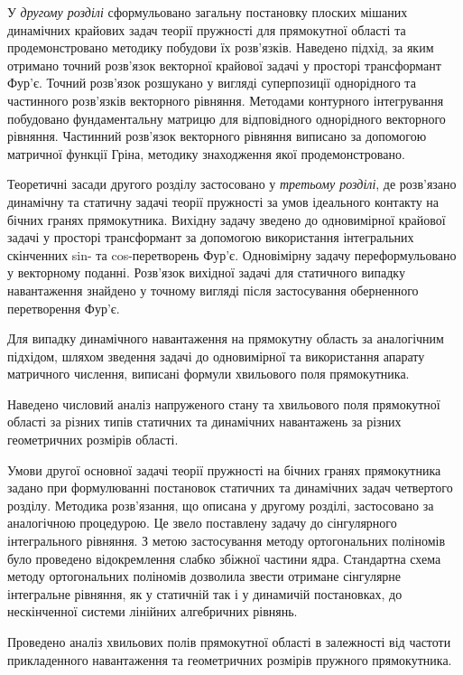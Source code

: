 У \textit{другому розділі} сформульовано загальну постановку плоских мішаних динамічних крайових задач теорії пружності для прямокутної області та
продемонстровано методику побудови їх розв'язків.
Наведено підхід, за яким отримано точний розв'язок векторної крайової задачі у просторі трансформант Фур'є.
Точний розв'язок розшукано у вигляді суперпозиції однорідного та частинного розв'язків векторного рівняння.
Методами контурного інтегрування побудовано фундаментальну матрицю для відповідного однорідного векторного рівняння.
Частинний розв'язок векторного рівняння виписано за допомогою матричної функції Гріна, методику знаходження якої продемонстровано.

Теоретичні засади другого розділу застосовано у \textit{третьому розділі}, де розв'язано динамічну та статичну задачі теорії пружності за умов ідеального контакту на бічних гранях прямокутника.
Вихідну задачу зведено до одновимірної крайової задачі у просторі трансформант за допомогою використання інтегральних скінченних sin- та cos-перетворень Фур'є.
Одновімірну задачу переформульовано у векторному поданні.
Розв'язок вихідної задачі для статичного випадку навантаження знайдено у точному вигляді після застосування оберненного перетворення Фур'є.

Для випадку динамічного навантаження на прямокутну область за аналогічним підхідом,
шляхом зведення задачі до одновимірної та використання апарату матричного числення, виписані формули хвильового поля прямокутника.

Наведено числовий аналіз напруженого стану та хвильового поля прямокутної області за різних типів статичних та динамічних навантажень за різних геометричних розмірів області.

Умови другої основної задачі теорії пружності на бічних гранях прямокутника задано при формулюванні постановок статичних та динамічних задач четвертого розділу.
Методика розв'язання, що описана у другому розділі, застосовано за аналогічною процедурою.
Це звело поставлену задачу до сінгулярного інтегрального рівняння.
З метою застосування методу ортогональних поліномів було проведено відокремлення слабко збіжної частини ядра.
Стандартна схема методу ортогональних поліномів дозволила звести отримане сінгулярне інтегральне рівняння,
як у статичній так і у динамичій постановках, до нескінченної системи лінійних алгебричних рівнянь.

Проведено аналіз хвильових полів прямокутної області в залежності від частоти прикладенного навантаження та геометричних розмірів пружного прямокутника. 

